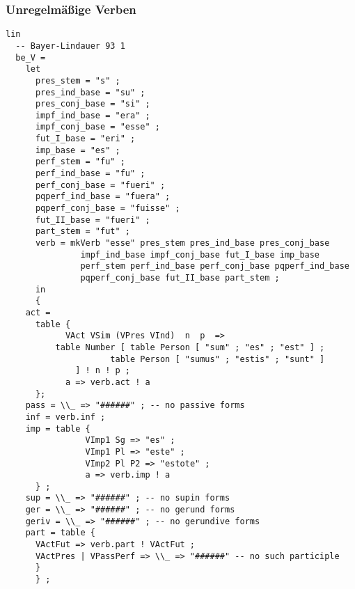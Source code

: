 \subsubsection{Unregelmäßige Verben}
\begin{lstlisting}[float=h!tp,caption={Regel um das Paradigma für unregelmäßige Verb \textit{esse} zu erzeugen (vgl. \textbf{IrregLat.gf})},label={GF-Irreg-Be},basicstyle=\small]
lin
  -- Bayer-Lindauer 93 1
  be_V =
    let
      pres_stem = "s" ;
      pres_ind_base = "su" ;
      pres_conj_base = "si" ;
      impf_ind_base = "era" ;
      impf_conj_base = "esse" ;
      fut_I_base = "eri" ;
      imp_base = "es" ;
      perf_stem = "fu" ;
      perf_ind_base = "fu" ;
      perf_conj_base = "fueri" ;
      pqperf_ind_base = "fuera" ;
      pqperf_conj_base = "fuisse" ;
      fut_II_base = "fueri" ;
      part_stem = "fut" ;
      verb = mkVerb "esse" pres_stem pres_ind_base pres_conj_base 
               impf_ind_base impf_conj_base fut_I_base imp_base 
               perf_stem perf_ind_base perf_conj_base pqperf_ind_base 
               pqperf_conj_base fut_II_base part_stem ;
      in
      {
	act = 
	  table {
    	    VAct VSim (VPres VInd)  n  p  => 
	      table Number [ table Person [ "sum" ; "es" ; "est" ] ;
    			     table Person [ "sumus" ; "estis" ; "sunt" ]
    	      ] ! n ! p ;
    	    a => verb.act ! a
	  };
	pass = \\_ => "######" ; -- no passive forms 
	inf = verb.inf ;
	imp = table {
                VImp1 Sg => "es" ;
                VImp1 Pl => "este" ;
                VImp2 Pl P2 => "estote" ;
                a => verb.imp ! a
	  } ;
	sup = \\_ => "######" ; -- no supin forms
	ger = \\_ => "######" ; -- no gerund forms
	geriv = \\_ => "######" ; -- no gerundive forms
	part = table {
	  VActFut => verb.part ! VActFut ;
	  VActPres | VPassPerf => \\_ => "######" -- no such participle
	  }
      } ;
\end{lstlisting}

